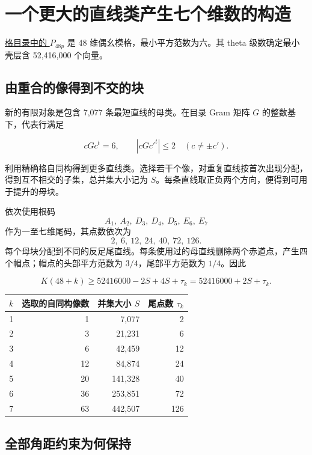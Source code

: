\section{一个更大的直线类产生七个维数的构造}

\href{https://www.math.rwth-aachen.de/~Gabriele.Nebe/LATTICES/P48p.html}{格目录中的
\(P_{48p}\)} 是 48 维偶幺模格，最小平方范数为六。其 theta
级数确定最小壳层含 52,416,000 个向量\cite{p48p-catalogue,nebe}。

\subsection{由重合的像得到不交的块}

新的有限对象是包含 7,077 条最短直线的母类。在目录 Gram 矩阵 \(G\)
的整数基下，代表行满足

\[
cGc^t=6,\qquad |cGc'^t|\le2\quad(c\ne\pm c').
\]

利用精确格自同构得到更多直线类。选择若干个像，对重复直线按首次出现分配，得到互不相交的子集，总并集大小记为
\(S\)。每条直线取正负两个方向，便得到可用于提升的母块。

依次使用根码
\[
A_1,\ A_2,\ D_3,\ D_4,\ D_5,\ E_6,\ E_7
\]
作为一至七维尾码，其点数依次为
\[
2,\ 6,\ 12,\ 24,\ 40,\ 72,\ 126.
\]
每个母块分配到不同的反足尾直线。每条使用过的母直线删除两个赤道点，产生四个帽点；帽点的头部平方范数为
\(3/4\)，尾部平方范数为 \(1/4\)。因此

\[
K(48+k)\ge52416000-2S+4S+\tau_k=52416000+2S+\tau_k.
\]

\begin{table}[htbp]
\centering
\begin{tabular}{@{}rrrr@{}}
\toprule
\(k\) & 选取的自同构像数 & 并集大小 \(S\) & 尾点数
\(\tau_k\)\tabularnewline
\midrule
1 & 1 & 7,077 & 2\tabularnewline
2 & 3 & 21,231 & 6\tabularnewline
3 & 6 & 42,459 & 12\tabularnewline
4 & 12 & 84,874 & 24\tabularnewline
5 & 20 & 141,328 & 40\tabularnewline
6 & 36 & 253,851 & 72\tabularnewline
7 & 63 & 442,507 & 126\tabularnewline
\bottomrule
\end{tabular}
\end{table}

\subsection{全部角距约束为何保持}

